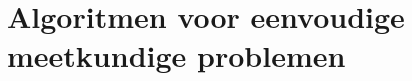 \documentclass[tmi_notities.tex]{subfiles}
\begin{document}
\chapter{Algoritmen voor eenvoudige meetkundige problemen}
\end{document}
